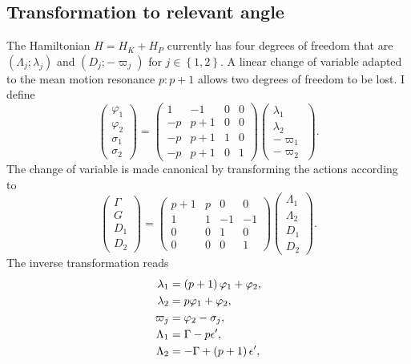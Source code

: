 \documentclass[12pt,a4paper,oneside]{article}
\begin{document}
\subsection{Transformation to relevant angle}
The Hamiltonian $H=H_K+H_P$ currently has four degrees of freedom that are $\left(\Lambda_j;\lambda_j\right)$ and $\left(D_j;-\varpi_j\right)$ for $j\in\left\lbrace1,2\right\rbrace$. A linear change of variable adapted to the mean motion resonance $p:p+1$ allows two degrees of freedom to be lost. I define \citep[\textit{e.g.}][]{Delisle2017}
\begin{equation}
	\begin{pmatrix}\varphi_1\\\varphi_2\\\sigma_1\\\sigma_2\end{pmatrix}=
	\begin{pmatrix}
		1&-1&0&0\\
		-p&p+1&0&0\\
		-p&p+1&1&0\\
		-p&p+1&0&1
	\end{pmatrix}
	\begin{pmatrix}\lambda_1\\\lambda_2\\-\varpi_1\\-\varpi_2\end{pmatrix}.
\end{equation}
The change of variable is made canonical by transforming the actions according to
\begin{equation}
	\begin{pmatrix}\Gamma\\G\\D_1\\D_2\end{pmatrix}=
	\begin{pmatrix}
		p+1&p&0&0\\
		1&1&-1&-1\\
		0&0&1&0\\
		0&0&0&1
	\end{pmatrix}
	\begin{pmatrix}\Lambda_1\\\Lambda_2\\D_1\\D_2\end{pmatrix}.
\end{equation}
The inverse transformation reads
\begin{equation}
	\begin{split}
		\lambda_1&=\left(p+1\right)\varphi_1+\varphi_2,\\
		\lambda_2&=p\varphi_1+\varphi_2,\\
		\varpi_j&=\varphi_2-\sigma_j,\\
		\Lambda_1&=\Gamma-p\epsilon',\\
		\Lambda_2&=-\Gamma+\left(p+1\right)\epsilon',
	\end{split}
\end{equation}
\end{document}
